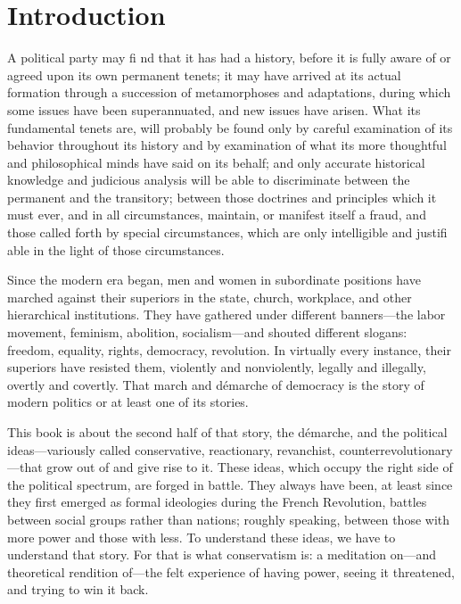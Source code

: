 \chapter{Introduction}\label{Introduction}
 \par 
A political party may ﬁ nd that it has had a history, before it is fully aware of or agreed upon its own permanent tenets; it may have arrived at its actual formation through a succession of metamorphoses and adaptations, during which some issues have been superannuated, and new issues have arisen. What its fundamental tenets are, will probably be found only by careful examination of its behavior throughout its history and by examination of what its more thoughtful and philosophical minds have said on its behalf; and only accurate historical knowledge and judicious analysis will be able to discriminate between the permanent and the transitory; between those doctrines and principles which it must ever, and in all circumstances, maintain, or manifest itself a fraud, and those called forth by special circumstances, which are only intelligible and justiﬁ able in the light of those circumstances.
 \par 
Since the modern era began, men and women in subordinate positions have marched against their superiors in the state, church, workplace, and other hierarchical institutions. They have gathered under different banners—the labor movement, feminism, abolition, socialism—and shouted different slogans: freedom, equality, rights, democracy, revolution. In virtually every instance, their superiors have resisted them, violently and nonviolently, legally and illegally, overtly and covertly. That march and démarche of democracy is the story of modern politics or at least one of its stories.
 \par 
This book is about the second half of that story, the démarche, and the political ideas—variously called conservative, reactionary, revanchist, counterrevolutionary—that grow out of and give rise to it. These ideas, which occupy the right side of the political spectrum, are forged in battle. They always have been, at least since they first emerged as formal ideologies during the French Revolution, battles between social groups rather than nations; roughly speaking, between those with more power and those with less. To understand these ideas, we have to understand that story. For that is what conservatism is: a meditation on—and theoretical rendition of—the felt experience of having power, seeing it threatened, and trying to win it back.
 \par 
